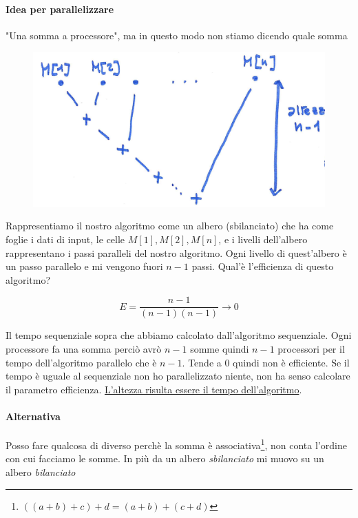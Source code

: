 \paragraph{Idea per parallelizzare} "Una somma a processore", ma in questo modo non stiamo dicendo quale somma

\begin{figure}[h]
    \centering
    \includegraphics[scale=0.4]{images/idea_sommatoria.png}
\end{figure}

Rappresentiamo il nostro algoritmo come un albero (sbilanciato) che ha come foglie i dati di input, le celle $M[1], M[2], M[n]$, e i livelli dell'albero rappresentano i passi paralleli del nostro algoritmo. Ogni livello di quest'albero è un passo parallelo e mi vengono fuori $n-1$ passi. Qual'è l'efficienza di questo algoritmo?

$$E=\frac{n-1}{(n-1)(n-1)} \rightarrow 0$$

Il tempo sequenziale sopra che abbiamo calcolato dall'algoritmo sequenziale. Ogni processore fa una somma perciò avrò $n-1$ somme quindi $n-1$ processori per il tempo dell'algoritmo parallelo che è $n-1$. Tende a $0$ quindi non è efficiente. Se il tempo è uguale al sequenziale non ho parallelizzato niente, non ha senso calcolare il parametro efficienza. \uline{L'altezza risulta essere il tempo dell'algoritmo}.

\paragraph{Alternativa} Posso fare qualcosa di diverso perchè la somma è associativa\footnote{$((a+b)+c)+d = (a+b) + (c+d)$}, non conta l'ordine con cui facciamo le somme. In più da un albero \textit{sbilanciato} mi muovo su un albero \textit{bilanciato}

